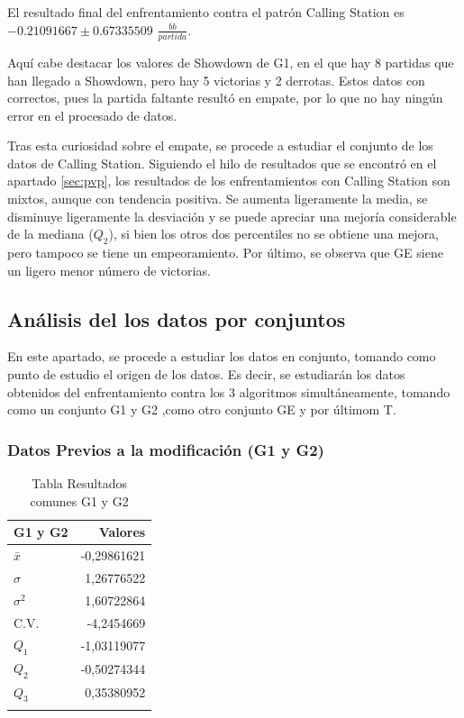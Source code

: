 El resultado final del enfrentamiento contra el patrón Calling Station es $-0.21091667\pm0.67335509$ $\frac{bb}{partida}$.

\vspace{5mm} %

Aquí cabe destacar los valores de Showdown de G1, en el que hay 8 partidas que han llegado a Showdown, pero hay 5 victorias y 2 derrotas. Estos datos con correctos, pues la partida faltante resultó en empate, por lo que no hay ningún error en el procesado de datos.

Tras esta curiosidad sobre el empate, se procede a estudiar el conjunto de los datos de Calling Station. Siguiendo el hilo de resultados que se encontró en el apartado \ref{sec:pvp}, los resultados de los enfrentamientos con Calling Station son mixtos, aunque con tendencia positiva. Se aumenta ligeramente la media, se disminuye ligeramente la desviación y se puede apreciar una mejoría considerable de la mediana ($Q_2$), si bien los otros dos percentiles no se obtiene una mejora, pero tampoco se tiene un empeoramiento.
Por último, se observa que GE siene un ligero menor número de victorias.

\clearpage

\subsection{Análisis del los datos por conjuntos}

En este apartado, se procede a estudiar los datos en conjunto, tomando como punto de estudio el origen de los datos. Es decir, se estudiarán los datos obtenidos del enfrentamiento contra los 3 algoritmos simultáneamente, tomando como un conjunto G1 y G2 ,como otro conjunto GE y por últimom T.

\subsubsection{Datos Previos a la modificación (G1 y G2)}

\begin{longtable}[c]{lr}
\hline
G1 y G2 & Valores \\ \hline
$\bar{x}$& -0,29861621 \\ 
$\sigma$ & 1,26776522 \\ 
$\sigma^2$& 1,60722864 \\ 
C.V.& -4,2454669 \\ 
$Q_1$ & -1,03119077 \\ 
$Q_2$ & -0,50274344 \\ 
$Q_3$ & 0,35380952 \\ \hline
\caption{Tabla Resultados comunes G1 y G2}
\label{tab:AGP}
\end{longtable}

